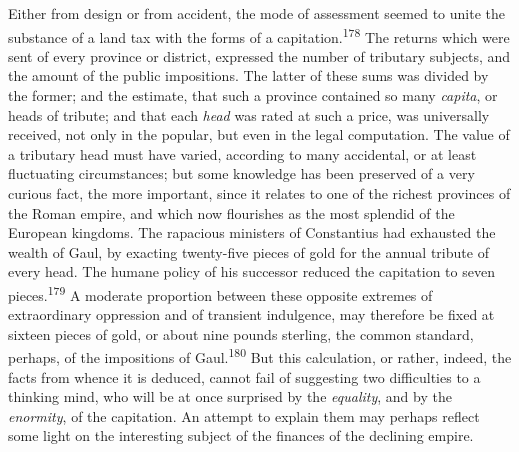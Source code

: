 

Either from design or from accident, the mode of assessment
seemed to unite the substance of a land tax with the forms of a
capitation.\textsuperscript{178} The returns which were sent of every province or
district, expressed the number of tributary subjects, and the
amount of the public impositions. The latter of these sums was
divided by the former; and the estimate, that such a province
contained so many \textit{capita}, or heads of tribute; and that each
\textit{head} was rated at such a price, was universally received, not
only in the popular, but even in the legal computation. The value
of a tributary head must have varied, according to many
accidental, or at least fluctuating circumstances; but some
knowledge has been preserved of a very curious fact, the more
important, since it relates to one of the richest provinces of
the Roman empire, and which now flourishes as the most splendid
of the European kingdoms. The rapacious ministers of Constantius
had exhausted the wealth of Gaul, by exacting twenty-five pieces
of gold for the annual tribute of every head. The humane policy
of his successor reduced the capitation to seven pieces.\textsuperscript{179} A
moderate proportion between these opposite extremes of
extraordinary oppression and of transient indulgence, may
therefore be fixed at sixteen pieces of gold, or about nine
pounds sterling, the common standard, perhaps, of the impositions
of Gaul.\textsuperscript{180} But this calculation, or rather, indeed, the facts
from whence it is deduced, cannot fail of suggesting two
difficulties to a thinking mind, who will be at once surprised by
the \textit{equality}, and by the \textit{enormity}, of the capitation. An
attempt to explain them may perhaps reflect some light on the
interesting subject of the finances of the declining empire.


